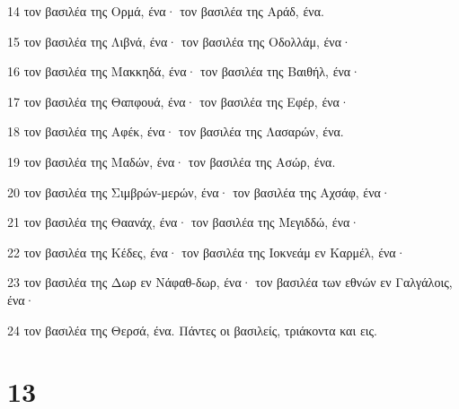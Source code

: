 \par 14 τον βασιλέα της Ορμά, ένα· τον βασιλέα της Αράδ, ένα.
\par 15 τον βασιλέα της Λιβνά, ένα· τον βασιλέα της Οδολλάμ, ένα·
\par 16 τον βασιλέα της Μακκηδά, ένα· τον βασιλέα της Βαιθήλ, ένα·
\par 17 τον βασιλέα της Θαπφουά, ένα· τον βασιλέα της Εφέρ, ένα·
\par 18 τον βασιλέα της Αφέκ, ένα· τον βασιλέα της Λασαρών, ένα.
\par 19 τον βασιλέα της Μαδών, ένα· τον βασιλέα της Ασώρ, ένα.
\par 20 τον βασιλέα της Σιμβρών-μερών, ένα· τον βασιλέα της Αχσάφ, ένα·
\par 21 τον βασιλέα της Θαανάχ, ένα· τον βασιλέα της Μεγιδδώ, ένα·
\par 22 τον βασιλέα της Κέδες, ένα· τον βασιλέα της Ιοκνεάμ εν Καρμέλ, ένα·
\par 23 τον βασιλέα της Δωρ εν Νάφαθ-δωρ, ένα· τον βασιλέα των εθνών εν Γαλγάλοις, ένα·
\par 24 τον βασιλέα της Θερσά, ένα. Πάντες οι βασιλείς, τριάκοντα και εις.

\chapter{13}

